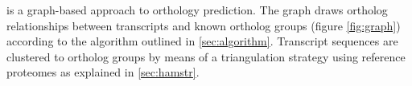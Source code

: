 \label{sec:graph}
\pname is a graph-based approach to orthology prediction. The graph draws
ortholog relationships between transcripts and known ortholog groups (figure
\ref{fig:graph}) according to the algorithm outlined in \autoref{sec:algorithm}.
Transcript sequences are clustered to ortholog groups by means of a
triangulation strategy using reference proteomes as explained in
\autoref{sec:hamstr}. 



